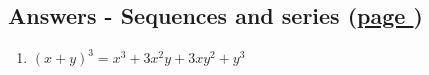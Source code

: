 \documentclass[../main.tex]{subfiles}
\begin{document}
\hypertarget{sequencesanswers}{\subsection*{Answers - Sequences and series (\hyperlink{sequenceslink}{page \pageref{Sequences}})}}

\label{Sequences answers}
\begin{enumerate}
    \item \( (x+y)^3 = x^3 + 3x^2 y + 3xy^2 +y^3 \)
    
\end{enumerate}
\end{document}
